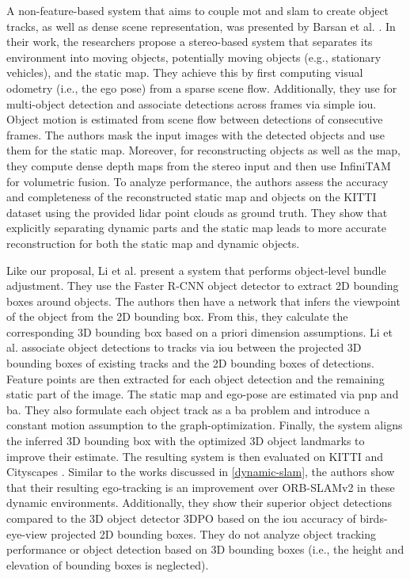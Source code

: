 \documentclass[headsepline, hidelinks, footsepline, footinclude=false, oneside, fontsize=11pt, paper=a4, listof=totoc, bibliography=totoc]{scrbook}
\begin{document}
A non-feature-based system that aims to couple \gls{mot} and \gls{slam} to create object tracks, as well as dense scene representation, was presented by Barsan et al. \cite{barsanRobustDenseMapping2018}.
In their work, the researchers propose a stereo-based system that separates its environment into moving objects, potentially moving objects (e.g., stationary vehicles), and the static map.
They achieve this by first computing visual odometry (i.e., the ego pose) from a sparse scene flow. 
Additionally, they use \cite{daiInstanceawareSemanticSegmentation2015} for multi-object detection and associate detections across frames via simple \gls{iou}. 
Object motion is estimated from scene flow between detections of consecutive frames.
The authors mask the input images with the detected objects and use them for the static map. Moreover, for reconstructing objects as well as the map, they compute dense depth maps from the stereo input and
then use InfiniTAM \cite{kahlerVeryHighFrame2015} for volumetric fusion.
To analyze performance, the authors assess the accuracy and completeness of the reconstructed static map and objects on the KITTI dataset \cite{geigerVisionMeetsRobotics2013} using the provided \gls{lidar} point clouds as ground truth.
They show that explicitly separating dynamic parts and the static map leads to more accurate reconstruction for both the static map and dynamic objects.

Like our proposal, Li et al. \cite{liStereoVisionbasedSemantic2018} present a system that performs object-level bundle adjustment. 
They use the Faster R-CNN \cite{renFasterRCNNRealTime2017} object detector to extract 2D bounding boxes around objects. 
The authors then have a network that infers the viewpoint of the object from the 2D bounding box. From this, they calculate the corresponding 3D bounding box based on a priori dimension assumptions.
Li et al. associate object detections to tracks via \gls{iou} between the projected 3D bounding boxes of existing tracks and the 2D bounding boxes of detections. 
Feature points are then extracted for each object detection and the remaining static part of the image. The static map and ego-pose are estimated via \gls{pnp} and \gls{ba}.
They also formulate each object track as a \gls{ba} problem and introduce a constant motion assumption to the graph-optimization. Finally, the system aligns the inferred 3D bounding box with the optimized 3D object landmarks
to improve their estimate.
The resulting system is then evaluated on KITTI \cite{geigerVisionMeetsRobotics2013} and Cityscapes \cite{cordtsCityscapesDatasetSemantic2016}. Similar to the works discussed in \cref{dynamic-slam}, the authors
show that their resulting ego-tracking is an improvement over ORB-SLAMv2 \cite{mur-artalORBSLAM2OpenSourceSLAM2017} in these dynamic environments.
Additionally, they show their superior object detections compared to the 3D object detector 3DPO \cite{NIPS2015_6da37dd3} based on the \gls{iou} accuracy of birds-eye-view projected 2D bounding boxes.
They do not analyze object tracking performance or object detection based on 3D bounding boxes (i.e., the height and elevation of bounding boxes is neglected).
\end{document}
